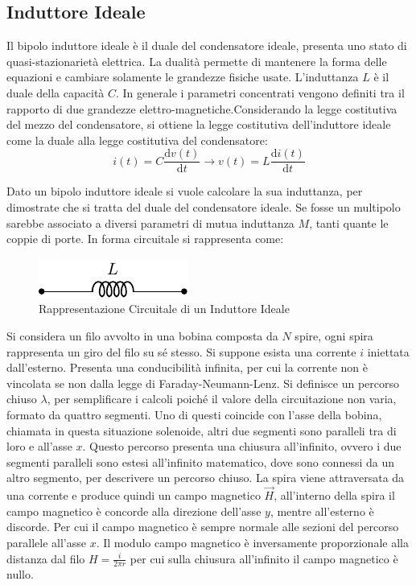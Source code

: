 \documentclass{article}
\newcommand{\df}{\mathrm{d}}
\numberwithin{equation}{subsection}
\begin{document}
\subsection{Induttore Ideale}
\label{sec:induttore-ideale}
Il bipolo induttore ideale è il duale del condensatore ideale, presenta uno stato di quasi-stazionarietà elettrica. La dualità permette di mantenere la forma delle equazioni 
e cambiare solamente le grandezze fisiche usate. L'induttanza $L$ è il duale della capacità $C$. In generale i parametri concentrati vengono definiti tra il rapporto di due 
grandezze elettro-magnetiche.Considerando la legge costitutiva del mezzo del condensatore, si ottiene la legge costitutiva dell'induttore ideale come la duale alla legge 
costitutiva del condensatore:
\begin{equation*}
    i(t)=\displaystyle C\frac{\df v(t)}{\df t}\to v(t)=L\frac{\df i(t)}{\df t}
\end{equation*}


Dato un bipolo induttore ideale si vuole calcolare la sua induttanza, per dimostrate che si tratta del duale del condensatore ideale. Se fosse un multipolo sarebbe 
associato a diversi parametri di mutua induttanza $M$, tanti quante le coppie di porte. In forma circuitale si rappresenta come:
\begin{figure}[H]%
    \centering
    \includegraphics{induttore.pdf}
    \caption{Rappresentazione Circuitale di un Induttore Ideale}
    \label{fig:induttore-forma-circuitale}
\end{figure}
Si considera un filo avvolto in una bobina composta da $N$ spire, ogni spira rappresenta un giro del filo su sé stesso. Si suppone esista una corrente $i$ iniettata dall'esterno. 
Presenta una conducibilità infinita, per cui la corrente non è vincolata se non dalla legge di Faraday-Neumann-Lenz. Si definisce un percorso chiuso $\lambda$, per semplificare 
i calcoli poiché il valore della circuitazione non varia, formato da quattro segmenti. Uno di questi coincide con l'asse della bobina, chiamata in questa situazione solenoide, 
altri due segmenti sono paralleli tra di loro e all'asse $x$. Questo percorso presenta una chiusura all'infinito, ovvero i due segmenti paralleli sono estesi all'infinito 
matematico, dove sono connessi da un altro segmento, per descrivere un percorso chiuso. La spira viene attraversata da una corrente e produce quindi un campo magnetico $\vec{H}$, 
all'interno della spira il campo magnetico è concorde alla direzione dell'asse $y$, mentre all'esterno è discorde. Per cui il campo magnetico è sempre normale alle sezioni del 
percorso parallele all'asse $x$. Il modulo campo magnetico è inversamente proporzionale alla distanza dal filo $H=\displaystyle\frac{i}{2\pi r}$ per cui sulla chiusura all'infinito 
il campo magnetico è nullo. 
\end{document}
